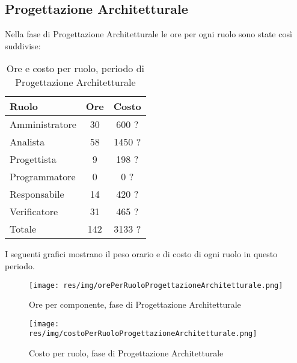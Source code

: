\subsection{Progettazione Architetturale}
Nella fase di Progettazione Architetturale le ore per ogni ruolo sono state cos\`i suddivise:

\begin{table}[H]
	\centering
	\begin{tabular}{ l c c }
		\textbf{Ruolo} & \textbf{Ore} & \textbf{Costo} \\
		\hline
		Amministratore & 30 & 600 ? \\
		Analista & 58 & 1450 ? \\
		Progettista & 9 & 198 ? \\
		Programmatore & 0 & 0 ? \\
		Responsabile & 14 & 420 ? \\
		Verificatore & 31 & 465 ? \\
		\hline
		Totale & 142 & 3133 ? \\
		\hline
	\end{tabular}
	\caption{Ore e costo per ruolo, periodo di Progettazione Architetturale}
\end{table}

I seguenti grafici mostrano il peso orario e di costo di ogni ruolo in questo periodo.

\begin{figure}[H]
  \begin{center}
    \texttt{[image: res/img/orePerRuoloProgettazioneArchitetturale.png]}
  \caption{Ore per componente, fase di Progettazione Architetturale}
  \end{center} 
\end{figure}  

\begin{figure}[H]
  \begin{center}
    \texttt{[image: res/img/costoPerRuoloProgettazioneArchitetturale.png]}
  \caption{Costo per ruolo, fase di Progettazione Architetturale}
  \end{center} 
\end{figure}  


